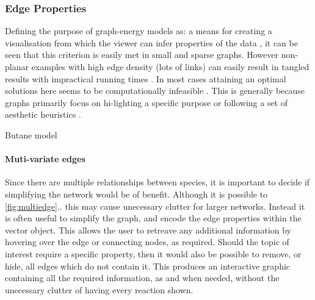 \subsubsection{Edge Properties}


Defining the purpose of graph-energy models as: a means for creating a visualisation from which the viewer can infer properties of the data \cite{noack}, it can be seen that this criterion is easily met in small and sparse graphs. However non-planar examples with high edge density (lots of links) can easily result in tangled results with impractical running times \cite{tvg}. In most cases attaining an optimal solutions here seems to be computationally infeasible \cite{nicelyanneal}. This is generally because graphs primarily focus on hi-lighting a specific purpose or following a set of aesthetic heuristics \cite{eyetrack}. 

Butane model 


\paragraph{Muti-variate edges}
Since there are multiple relationships between species, it is important to decide if simplifying the network would be of benefit. Although it is possible to \autoref{fig:multiedge}.. 
this may cause unecessary clutter for larger networks. Instead it is often useful to simplify the graph, and encode the edge properties within the vector object. This allows the user to retreave any additional information by hovering over the edge or connecting nodes, as required. Should the topic of interest require a specific property, then it would also be possible to remove, or hide, all edges which do not contain it. This produces an interactive graphic containing all the required information, as and when needed, without the unecessary clutter of having every reaction shown. 

